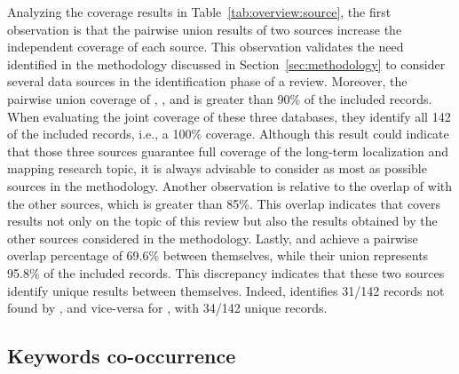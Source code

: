 Analyzing the coverage results in Table~\ref{tab:overview:source}, the first observation is that the pairwise union results of two sources increase the independent coverage of each source. This observation validates the need identified in the methodology discussed in Section~\ref{sec:methodology} to consider several data sources in the identification phase of a review. Moreover, the pairwise union coverage of , , and  is greater than 90\% of the included records. When evaluating the joint coverage of these three databases, they identify all 142 of the included records, i.e., a 100\% coverage. Although this result could indicate that those three sources guarantee full coverage of the long-term localization and mapping research topic, it is always advisable to consider as most as possible sources in the methodology. Another observation is relative to the overlap of  with the other sources, which is greater than 85\%. This overlap indicates that  covers results not only on the topic of this review but also the results obtained by the other sources considered in the methodology. Lastly,  and  achieve a pairwise overlap percentage of 69.6\% between themselves, while their union represents 95.8\% of the included records. This discrepancy indicates that these two sources identify unique results between themselves. Indeed,  identifies 31/142 records not found by , and vice-versa for , with 34/142 unique records.

\subsection{Keywords co-occurrence}
\label{sec:overview:kw}

